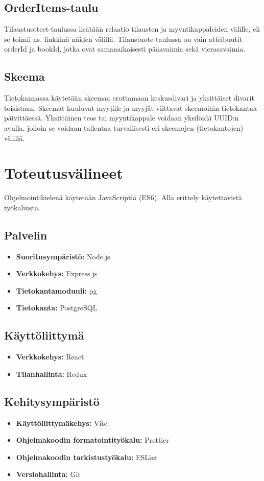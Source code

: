 \documentclass[11pt,a4paper]{article}
\begin{document}
\subsection{OrderItems-taulu}

Tilaustuotteet-taulussa lisätään relaatio tilausten ja myyntikappaleiden välille, eli se toimii ns. linkkinä näiden välillä. Tilaustuote-taulussa on vain attribuutit orderId ja bookId, jotka ovat samanaikaisesti pääavaimia sekä vierasavaimia.

\subsection{Skeema}

Tietokannassa käytetään skeemaa erottamaan keskusdivari ja yksittäiset divarit toisistaan. Skeemat kuuluvat myyjille ja myyjät viittavat skeemoihin tietokantaa päivittäessä. Yksittäinen teos tai myyntikappale voidaan yksilöidä UUID:n avulla, jolloin se voidaan tallentaa turvallisesti eri skeemojen (tietokantojen) välillä.

\section{Toteutusvälineet}

Ohjelmointikielenä käytetään JavaScriptiä (ES6). Alla erittely käytettävistä työkaluista.

\subsection{Palvelin}

\begin{itemize}
	\item \textbf{Suoritusympäristö:} Node.js
	\item \textbf{Verkkokehys:} Express.js
	\item \textbf{Tietokantamoduuli:} pg
	\item \textbf{Tietokanta:} PostgreSQL
\end{itemize}

\subsection{Käyttöliittymä}

\begin{itemize}
	\item \textbf{Verkkokehys:} React
	\item \textbf{Tilanhallinta:} Redux
\end{itemize}

\subsection{Kehitysympäristö}

\begin{itemize}
	\item \textbf{Käyttöliittymäkehys:} Vite
	\item \textbf{Ohjelmakoodin formatointityökalu:} Prettier
	\item \textbf{Ohjelmakoodin tarkistustyökalu:} ESLint
	\item \textbf{Versiohallinta:} Git
\end{itemize}
\end{document}
